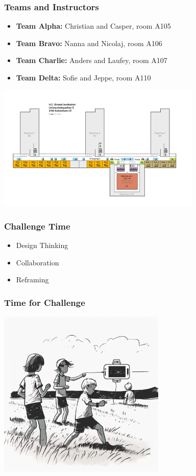 \documentclass[10pt]{beamer}
\begin{document}
\begin{frame}
 \frametitle{Teams and Instructors}
 \begin{itemize}
 \item{\textbf{Team Alpha:} Christian and Casper, room A105}
 \item{\textbf{Team Bravo:} Nanna and Nicolaj, room A106}
 \item{\textbf{Team Charlie:} Anders and Laufey, room A107}
 \item{\textbf{Team Delta:} Sofie and Jeppe, room A110}
\end{itemize}
\begin{minipage}{0.4\linewidth} 
      \includegraphics[height=6cm]{images/team_rooms}
\end{minipage}
\end{frame}

\begin{frame}
 \frametitle{Challenge Time}
 \begin{itemize}
   \item {Design Thinking}
    \item{Collaboration}
    \item{Reframing}
 \end{itemize}
\end{frame}


\begin{frame}
 \frametitle{Time for Challenge}
   \vspace{5 mm}
    \hspace{8 mm}

  \includegraphics[height=8cm]{images/challenge_time}

\end{frame}
\end{document}
